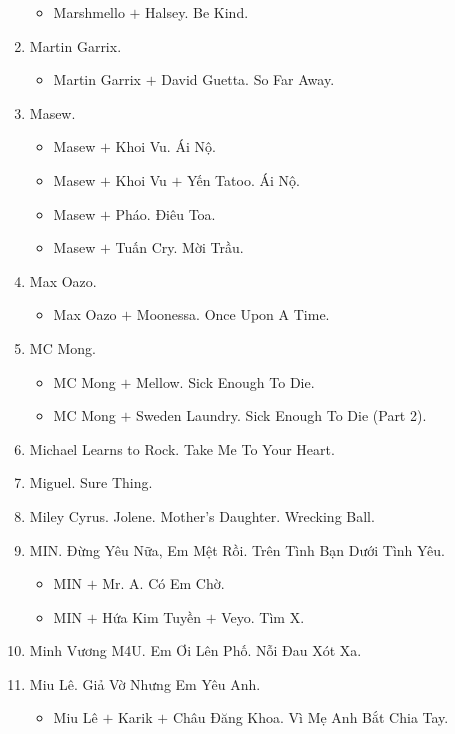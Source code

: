 \documentclass{article}
\begin{document}
\begin{enumerate}
\begin{itemize}
		\item {\sc Marshmello $+$ Halsey.} Be Kind.
	\end{itemize}
	\item {\sc Martin Garrix.}
	\begin{itemize}
		\item {\sc Martin Garrix $+$ David Guetta.} So Far Away.
	\end{itemize}
	\item {\sc Masew.}
	\begin{itemize}
		\item {\sc Masew $+$ Khoi Vu.} Ái Nộ.
		\item {\sc Masew $+$ Khoi Vu $+$ Yến Tatoo.} Ái Nộ.
		\item {\sc Masew $+$ Pháo.} Điêu Toa.
		\item {\sc Masew $+$ Tuấn Cry.} Mời Trầu.
	\end{itemize}
	\item {\sc Max Oazo.}
	\begin{itemize}
		\item {\sc Max Oazo $+$ Moonessa.} Once Upon A Time.
	\end{itemize}
	\item {\sc MC Mong.}
	\begin{itemize}
		\item {\sc MC Mong $+$ Mellow.} Sick Enough To Die.
		\item {\sc MC Mong $+$ Sweden Laundry.} Sick Enough To Die (Part 2).
	\end{itemize}
	\item {\sc Michael Learns to Rock.} Take Me To Your Heart.
	\item {\sc Miguel.} Sure Thing.
	\item {\sc Miley Cyrus.} Jolene. Mother's Daughter. Wrecking Ball.
	\item {\sc MIN.} Đừng Yêu Nữa, Em Mệt Rồi. Trên Tình Bạn Dưới Tình Yêu.
	\begin{itemize}
		\item {\sc MIN $+$ Mr. A.} Có Em Chờ.
		\item {\sc MIN $+$ Hứa Kim Tuyền $+$ Veyo.} Tìm X.
	\end{itemize}
	\item {\sc Minh Vương M4U.} Em Ơi Lên Phố. Nỗi Đau Xót Xa.
	\item {\sc Miu Lê.} Giả Vờ Nhưng Em Yêu Anh.
	\begin{itemize}
		\item {\sc Miu Lê $+$ Karik $+$ Châu Đăng Khoa.} Vì Mẹ Anh Bắt Chia Tay.

\end{itemize}
\end{enumerate}
\end{document}
